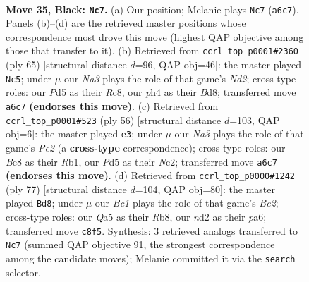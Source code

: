 \documentclass[11pt]{article}
\begin{document}
\clearpage

\begin{figure}[p]\centering
\begin{subfigure}{0.46\textwidth}\centering
\resizebox{\linewidth}{!}{%
\newchessgame
\chessboard[
  setfen={r1b2r2/pp3p1k/n4Bp1/q2p4/B5pP/NP6/R1PNQP2/4R1K1 b - - 1 35},
  showmover=false,
  pgfstyle=straightmove, color=movearrow, markmove={a6-c7}
]}
\caption{}
\end{subfigure}\hfill
\begin{subfigure}{0.46\textwidth}\centering
\resizebox{\linewidth}{!}{%
\newchessgame
\chessboard[
  setfen={2rb2k1/1prnq1p1/4p2p/1P6/p1N2P2/P2Q3P/1B4PK/2R2R2 b - - 6 33},
  showmover=false,
  pgfstyle=straightmove, color=movearrow, markmove={d7-c5}
]}
\caption{}
\end{subfigure}
\\[4pt]
\begin{subfigure}{0.46\textwidth}\centering
\resizebox{\linewidth}{!}{%
\newchessgame
\chessboard[
  setfen={1rb1r1k1/4qpnp/p2p2p1/2pP4/8/R5PP/1PN1PPB1/1RQ3K1 w - - 0 29},
  showmover=false,
  pgfstyle=straightmove, color=movearrow, markmove={e2-e3}
]}
\caption{}
\end{subfigure}\hfill
\begin{subfigure}{0.46\textwidth}\centering
\resizebox{\linewidth}{!}{%
\newchessgame
\chessboard[
  setfen={1r6/qB2br1k/Pp1p2p1/1QpP1b1p/4p3/1R2B3/R4PP1/6K1 b - - 3 39},
  showmover=false,
  pgfstyle=straightmove, color=movearrow, markmove={e7-d8}
]}
\caption{}
\end{subfigure}
\caption{\textbf{Move 35, Black: \texttt{Nc7}.} (a) Our position; Melanie plays \texttt{Nc7} (\texttt{a6c7}). Panels (b)--(d) are the retrieved master positions whose correspondence most drove this move (highest QAP objective among those that transfer to it). (b) Retrieved from \texttt{ccrl\_top\_p0001\#2360} (ply 65) [structural distance $d$=96, QAP obj=46]: the master played \texttt{Nc5}; under $\mu$ our \emph{Na3} plays the role of that game's \emph{Nd2}; cross-type roles: our \emph{P}d5 as their \emph{R}c8, our \emph{p}h4 as their \emph{B}d8; transferred move \texttt{a6c7} \textbf{(endorses this move)}. (c) Retrieved from \texttt{ccrl\_top\_p0001\#523} (ply 56) [structural distance $d$=103, QAP obj=6]: the master played \texttt{e3}; under $\mu$ our \emph{Na3} plays the role of that game's \emph{Pe2} (a \textbf{cross-type} correspondence); cross-type roles: our \emph{B}c8 as their \emph{R}b1, our \emph{P}d5 as their \emph{N}c2; transferred move \texttt{a6c7} \textbf{(endorses this move)}. (d) Retrieved from \texttt{ccrl\_top\_p0000\#1242} (ply 77) [structural distance $d$=104, QAP obj=80]: the master played \texttt{Bd8}; under $\mu$ our \emph{Bc1} plays the role of that game's \emph{Be2}; cross-type roles: our \emph{Q}a5 as their \emph{R}b8, our \emph{n}d2 as their \emph{p}a6; transferred move \texttt{c8f5}. Synthesis: 3 retrieved analogs transferred to \texttt{Nc7} (summed QAP objective 91, the strongest correspondence among the candidate moves); Melanie committed it via the \texttt{search} selector.}
\label{fig:thought-m69}
\end{figure}
\end{document}
